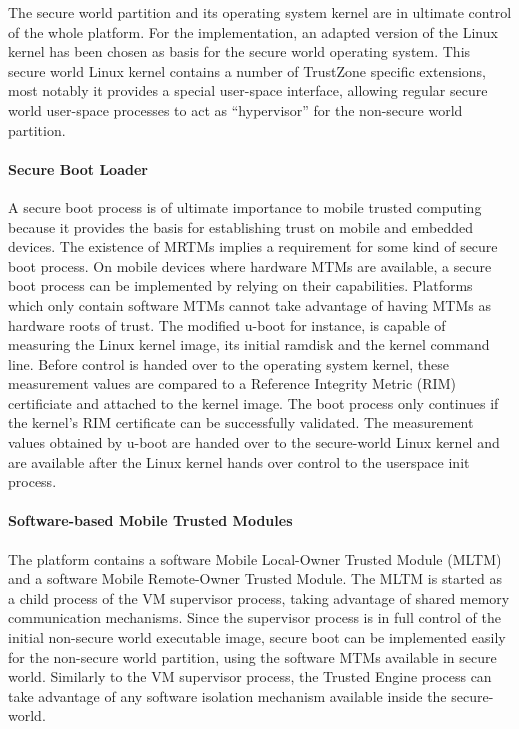 \documentclass{article}
\begin{document}
The secure world partition and its operating system kernel are in ultimate control of the whole platform. For the implementation, an adapted version of the Linux kernel has been chosen as basis for the secure world operating system. This secure world Linux kernel contains a number of TrustZone specific extensions, most notably it provides a special user-space interface, allowing regular secure world user-space processes to act as “hypervisor” for the non-secure world partition.

\paragraph{Secure Boot Loader}

A secure boot process is of ultimate importance to mobile trusted computing because it provides the basis for establishing trust on mobile and embedded devices. The existence of MRTMs implies a requirement for some kind of secure boot process. On mobile devices where hardware MTMs are available, a secure boot process can be implemented by relying on their capabilities. Platforms which only contain software MTMs cannot take advantage of having MTMs as hardware roots of trust. The modified u-boot for instance, is capable of measuring the Linux kernel image, its initial ramdisk and the kernel command line. Before control is handed over to the operating system kernel, these measurement values are compared to a Reference Integrity Metric (RIM) certificiate and attached to the kernel image. The boot process only continues if the kernel’s RIM certificate can be successfully validated. The measurement values obtained by u-boot are handed over to the secure-world Linux kernel and are available after the Linux kernel hands over control to the userspace init process.

\paragraph{Software-based Mobile Trusted Modules}

The platform contains a software Mobile Local-Owner Trusted Module (MLTM) and a software Mobile Remote-Owner Trusted Module. The MLTM is started as a child process of the VM supervisor process, taking advantage of shared memory communication mechanisms. Since the supervisor process is in full control of the initial non-secure world executable image, secure boot can be implemented easily for the non-secure world partition, using the software MTMs available in secure world. Similarly to the VM supervisor process, the Trusted Engine process can take advantage of any software isolation mechanism available inside the secure-world.
\end{document}
